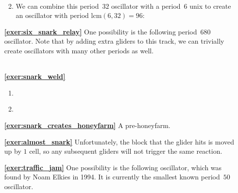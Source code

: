 \begin{multicols}{2}
\begin{itemize}[leftmargin=0em]
\begin{enumerate}[leftmargin=1.5em,label=\bf\color{ocre}(\alph*)]
		 \\

		\item We can combine this period~$32$ oscillator with a period~$6$ unix to create an oscillator with period $\mathrm{lcm}(6,32) = 96$: \\[-0.6em]
		
	\end{enumerate}
	
	
	\item[\bf\color{ocre}\sffamily\ref{exer:six_snark_relay}] One possibility is the following period~$680$ oscillator. Note that by adding extra gliders to this track, we can trivially create oscillators with many other periods as well. \\[-0.6em]
	
	 \\
	

	\item[\bf\color{ocre}\sffamily\ref{exer:snark_weld}]
	\begin{enumerate}[leftmargin=1.5em,label=\bf\color{ocre}(\alph*)]
		\item {}
		
		\item {} \\
	\end{enumerate}
	
	
	\item[\bf\color{ocre}\sffamily\ref{exer:snark_creates_honeyfarm}] A pre-honeyfarm. \\
	
	
	\item[\bf\color{ocre}\sffamily\ref{exer:almost_snark}] Unfortunately, the block that the glider hits is moved up by $1$ cell, so any subsequent gliders will not trigger the same reaction. \\
	
	
	\item[\bf\color{ocre}\sffamily\ref{exer:traffic_jam}] One possibility is the following oscillator, which was found by Noam Elkies in 1994. It is currently the smallest known period~$50$ oscillator. \\[-0.6em]
	

\end{itemize}
\end{multicols}
